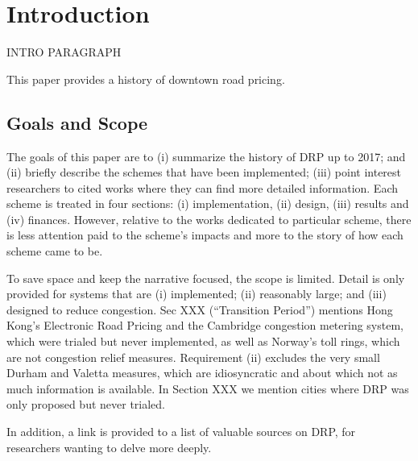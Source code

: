 \section{Introduction}

INTRO PARAGRAPH

This paper provides a history of downtown road pricing. 



\subsection{Goals and Scope}

The goals of this paper are to (i) summarize the history of DRP up to 2017; and (ii) briefly describe the schemes that have been implemented; (iii) point interest researchers to cited works where they can find more detailed information. Each scheme is treated in four sections: (i) implementation, (ii) design, (iii) results and (iv) finances. However, relative to the works dedicated to particular scheme, there is less attention paid to the scheme's impacts and more to the story of how each scheme came to be.

To save space and keep the narrative focused, the scope is limited. Detail is only provided for systems that are (i) implemented; (ii) reasonably large; and (iii) designed to reduce congestion. Sec XXX (``Transition Period'') mentions Hong Kong's Electronic Road Pricing and the Cambridge congestion metering system, which were trialed but never implemented, as well as Norway's toll rings, which are not congestion relief measures. Requirement (ii) excludes the very small Durham and Valetta measures, which are idiosyncratic and about which not as much information is available. In Section XXX we mention cities where DRP was only proposed but never trialed.

In addition, a link is provided to a list of valuable sources on DRP, for researchers wanting to delve more deeply.
